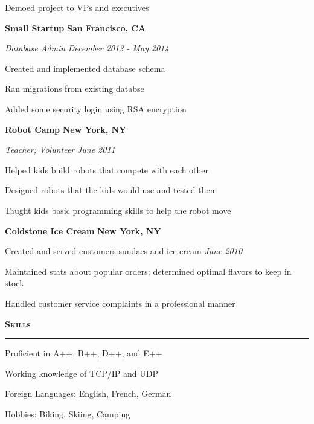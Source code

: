 \documentclass[11pt]{article}
\newcommand\resumeentry[2]{#1 \hfill #2}
\begin{document}
\resumeentry{Demoed project to VPs and executives}{}
\smallskip

\noindent\resumeentry{\textbf{Small Startup}}{\textbf{San Francisco, CA}}

\noindent\resumeentry{\textit{Database Admin}}{\textit{December 2013 - May 2014}}

\resumeentry{Created and implemented database schema}{}

\resumeentry{Ran migrations from existing databse}{}

\resumeentry{Added some security login using RSA encryption}{}
\smallskip

\noindent\resumeentry{\textbf{Robot Camp}}{\textbf{New York, NY}}

\noindent\resumeentry{\textit{Teacher; Volunteer}}{\textit{June 2011}}

\resumeentry{Helped kids build robots that compete with each other}{}

\resumeentry{Designed robots that the kids would use and tested them}{}

\resumeentry{Taught kids basic programming skills to help the robot move}{}
\smallskip

\noindent\resumeentry{\textbf{Coldstone Ice Cream}}{\textbf{New York, NY}}

\resumeentry{Created and served customers sundaes and ice cream}{\textit{June 2010}}

\resumeentry{Maintained stats about popular orders; determined optimal flavors to keep in stock}{}

\resumeentry{Handled customer service complaints in a professional manner}{}
\smallskip

\smallskip
\smallskip
\noindent\textbf{\textsc{Skills}}\\
\rule{\textwidth}{1pt}

\resumeentry{Proficient in A++, B++, D++, and E++}{\textit{}}

\resumeentry{Working knowledge of TCP/IP and UDP}{}

\resumeentry{Foreign Languages: English, French, German}{}

\resumeentry{Hobbies: Biking, Skiing, Camping}{}
\smallskip

\smallskip
\end{document}

